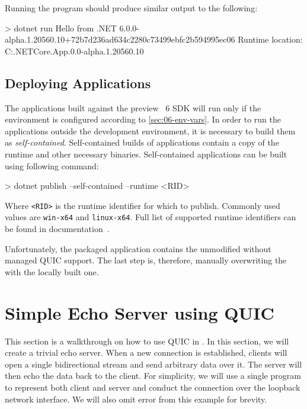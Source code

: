 Running the program should produce similar output to the following:

\begin{myVerbatim}
> dotnet run
Hello from .NET 6.0.0-alpha.1.20560.10+72b7d236ad634c2280c73499ebfc2b594995ec06
Runtime location: C:\dotnet\shared\Microsoft.NETCore.App\6.0.0-alpha.1.20560.10
\end{myVerbatim}

\subsection{Deploying \dotnet{} Applications}


The applications built against the preview \dotnet{}~6 SDK will run only if the environment is
configured according to \autoref{sec:06-env-vars}. In order to run the applications outside the
development environment, it is necessary to build them as \textit{self-contained}. Self-contained
builds of \dotnet{} applications contain a copy of the \dotnet{} runtime and other necessary
binaries. Self-contained applications can be built using following command:

\begin{myVerbatim}
> dotnet publish --self-contained --runtime <RID>
\end{myVerbatim}

Where \texttt{<RID>} is the runtime identifier for which to publish. Commonly used values are
\texttt{win-x64} and \texttt{linux-x64}. Full list of supported runtime identifiers can be found in
documentation~\cite{dotnetRIDs}.

Unfortunately, the packaged application contains the unmodified \SystemNetQuicDll{} without managed
QUIC support. The last step is, therefore, manually overwriting the \SystemNetQuicDll{} with the
locally built one.


\section{Simple Echo Server using QUIC}\label{sec:06-tutorial}

This section is a walkthrough on how to use QUIC in \dotnet{}. In this section, we will create a
trivial echo server. When a new connection is established, clients will open a single bidirectional
stream and send arbitrary data over it. The server will then echo the data back to the client. For
simplicity, we will use a single \dotnet{} program to represent both client and server and conduct
the connection over the loopback network interface. We will also omit error from this example for
brevity.

